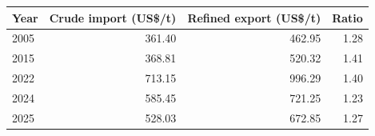 \begin{tabular}{lrrr}
\toprule
Year & Crude import (US\$/t) & Refined export (US\$/t) & Ratio \\
\midrule
2005 & 361.40 & 462.95 & 1.28 \\
2015 & 368.81 & 520.32 & 1.41 \\
2022 & 713.15 & 996.29 & 1.40 \\
2024 & 585.45 & 721.25 & 1.23 \\
2025 & 528.03 & 672.85 & 1.27 \\
\bottomrule
\end{tabular}
